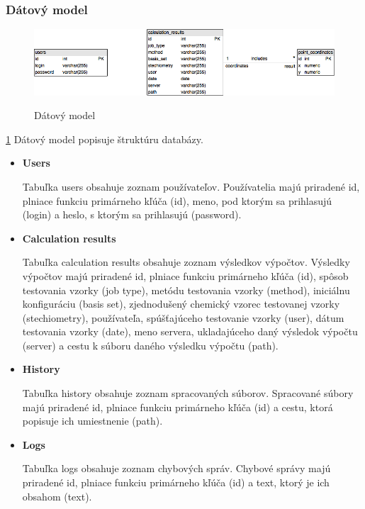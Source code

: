 \documentclass[12pt,a4paper]{article}
\begin{document}
\subsubsection{Dátový model}
\begin{figure}[H]
	\caption{Dátový model}
	\includegraphics[width=\textwidth]{datovy_model}
	\label{fig:datovy_model}
\end{figure}
\ref{fig:datovy_model}
Dátový model popisuje štruktúru databázy.
\begin{itemize}
	\item{\bf Users} \par
	Tabuľka users obsahuje zoznam používateľov. Používatelia majú priradené id, plniace funkciu primárneho kľúča (id), meno, pod ktorým sa prihlasujú (login) a heslo, s ktorým sa prihlasujú (password).
	\item{\bf Calculation results} \par
	Tabuľka calculation results obsahuje zoznam výsledkov výpočtov. Výsledky výpočtov majú priradené id, plniace funkciu primárneho kľúča (id), spôsob testovania vzorky (job type), metódu testovania vzorky (method), iniciálnu konfiguráciu (basis set), zjednodušený chemický vzorec testovanej vzorky (stechiometry), používateľa, spúšťajúceho testovanie vzorky (user), dátum testovania vzorky (date), meno servera, ukladajúceho daný výsledok výpočtu (server) a cestu k súboru daného výsledku výpočtu (path).
	\item{\bf History} \par
	Tabuľka history obsahuje zoznam spracovaných súborov. Spracované súbory majú priradené id, plniace funkciu primárneho kľúča (id) a cestu, ktorá popisuje ich umiestnenie (path).
	\item{\bf Logs} \par
	Tabuľka logs obsahuje zoznam chybových správ. Chybové správy majú priradené id, plniace funkciu primárneho kľúča (id) a text, ktorý je ich obsahom (text).
\end{itemize}
\end{document}
